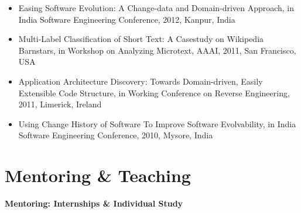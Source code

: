 \documentclass[letterpaper,11pt]{article}
\begin{document}
\begin{itemize}
  \vspace{-1pt}\item\small{Easing Software Evolution: A Change-data and Domain-driven Approach, in India Software Engineering Conference, 2012, Kanpur, India}

  \vspace{-1pt}\item\small{Multi-Label Classification of Short Text: A Casestudy on Wikipedia Barnstars, in Workshop on Analyzing Microtext, AAAI, 2011, San Francisco, USA}

  \vspace{-1pt}\item\small{Application Architecture Discovery: Towards Domain-driven, Easily Extensible Code Structure, in Working Conference on Reverse Engineering, 2011, Limerick, Ireland}

  \vspace{-1pt}\item\small{Using Change History of Software To Improve Software Evolvability, in India Software Engineering Conference, 2010, Mysore, India}

\end{itemize}


\section{Mentoring \& Teaching}

\textbf{Mentoring: Internships \& Individual Study} 
\end{document}
